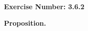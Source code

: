 \documentclass{article}
\begin{document}
\noindent \textbf{Exercise Number: 3.6.2}  %


\noindent \textbf{Proposition.} 
\end{document}
